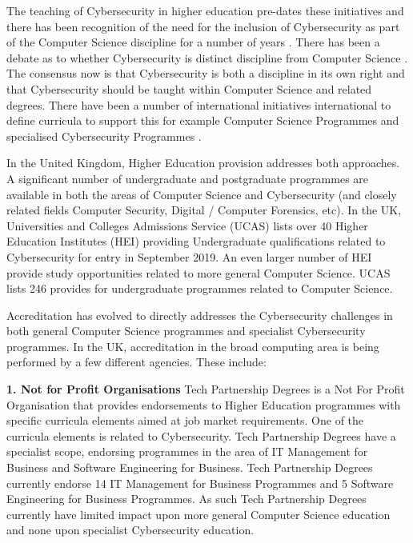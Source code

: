 \documentclass[conference]{IEEEtran}
\begin{document}
The teaching of Cybersecurity in higher education pre-dates these initiatives and there has been recognition of the need for the inclusion of Cybersecurity as part of the Computer Science discipline for a number of years \cite{Hentea2006}. There has  been a debate as to whether Cybersecurity is distinct discipline from Computer Science \cite{McGettreick2013}. The consensus now is that Cybersecurity is both a discipline in its own right and that Cybersecurity should be taught within Computer Science and related degrees. There have been a number of international initiatives international to define curricula to support this for example Computer Science Programmes  \cite[which added ``Information Assurance and Security'' for the first time]{ACM2013a} and specialised Cybersecurity Programmes \cite{ACMIEEEAISSIGSECIFIP}.

In the United Kingdom, Higher Education provision addresses both approaches. A significant number of undergraduate and postgraduate programmes are available in both the areas of Computer Science and Cybersecurity (and closely related fields Computer Security, Digital / Computer Forensics, etc). In the UK, Universities and Colleges Admissions Service (UCAS) lists over 40 Higher Education Institutes (HEI) providing Undergraduate qualifications related to Cybersecurity for entry in September 2019. An even larger number of HEI provide study opportunities related to more general Computer Science. UCAS lists 246 provides for undergraduate programmes related to Computer Science. 

Accreditation has evolved to directly addresses the Cybersecurity challenges in both general Computer Science programmes and specialist Cybersecurity programmes. In the UK, accreditation in the broad computing area is being performed by a few different agencies. These include:

\textbf{1. Not for Profit Organisations}
Tech Partnership Degrees is a Not For Profit Organisation that provides endorsements to Higher Education programmes with specific curricula elements aimed at job market requirements. One of the curricula elements is related to Cybersecurity. Tech Partnership Degrees have a specialist scope, endorsing programmes in the area of IT Management for Business and Software Engineering for Business.  Tech Partnership Degrees currently endorse 14 IT Management for Business Programmes and 5 Software Engineering for Business Programmes. As such Tech Partnership Degrees currently have limited impact upon more general Computer Science education and none upon specialist Cybersecurity education. 
\end{document}
